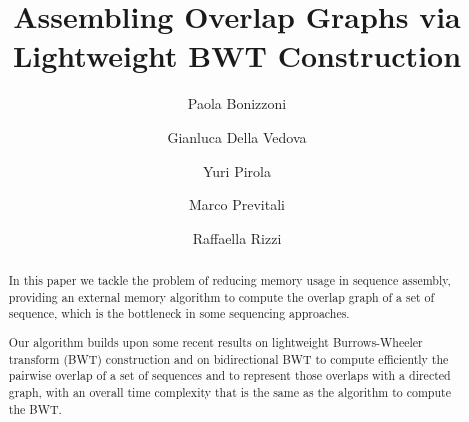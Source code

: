 \documentclass[runningheads,envcountsame,a4paper]{llncs}
\newcommand{\notaestesa}[2]{%
 \marginpar{\color{red!75!black}\textbf{\texttimes}}%
 {\color{red!75!black}%
 [\,\textbullet\,\textsf{\textbf{#1:}} %
 \textsf{\footnotesize#2}\,\textbullet\,]}%
}
\newcommand{\YP}[1]{\notaestesa{YP}{#1}}
\newcommand{\etal}{\textit{et al.}\xspace}
\begin{document}
\title{Assembling Overlap Graphs via Lightweight BWT Construction}

\author{%
  Paola Bonizzoni \and
  Gianluca Della Vedova \and
  Yuri Pirola \and
  Marco Previtali \and
  Raffaella Rizzi
}
\authorrunning{Bonizzoni \etal}


\maketitle



\begin{abstract}
In this paper we tackle the problem of reducing memory usage in sequence
assembly, providing an external memory algorithm to compute the overlap graph of
a set of sequence, which is the bottleneck in some sequencing approaches.

Our algorithm builds upon some recent results on lightweight Burrows-Wheeler
transform (BWT) construction and on bidirectional BWT to compute efficiently the
pairwise overlap of a set of sequences and to represent those overlaps with a
directed graph, with an overall time complexity that is the same as the
algorithm to compute the BWT.
\end{abstract}
\end{document}

